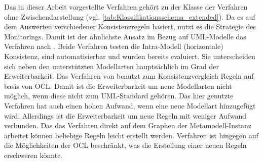 Das in dieser Arbeit vorgestellte Verfahren gehört zu der Klasse der Verfahren ohne Zwischendarstellung (vgl. \cref{tab:Klassifikationsschema_extended}).
Da es auf dem Auswerten verschiedener Konsistenzregeln basiert, nutzt es die Strategie des Monitorings.
Damit ist der ähnlichste Ansatz im Bezug auf UML-Modelle das Verfahren nach \cite{Egyed2006}.
Beide Verfahren testen die Intra-Modell (horizontale) Konsistenz, sind automatisierbar und wurden bereits evaluiert.
Sie unterscheiden sich neben den unterstützten Modellarten hauptsächlich im Grad der Erweiterbarkeit.
Das Verfahren von \cite{Egyed2006} benutzt zum Konsistenzvergleich Regeln auf basis von OCL.
Damit ist die Erweiterbarkeit um neue Modellarten nicht möglich, wenn diese nicht zum UML-Standard gehören.
Das hier genutzte Verfahren hat auch einen hohen Aufwand, wenn eine neue Modellart hinzugefügt wird.
Allerdings ist die Erweiterbarkeit um neue Regeln mit weniger Aufwand verbunden.
Das das Verfahren direkt auf dem Graphen der Metamodell-Instanz arbeitet können beliebige Regeln leicht erstellt werden.
\cite{Egyed2006} Verfahren ist hingegen auf die Möglichkeiten der OCL beschränkt, was die Erstellung einer neuen Regeln erschweren könnte.

